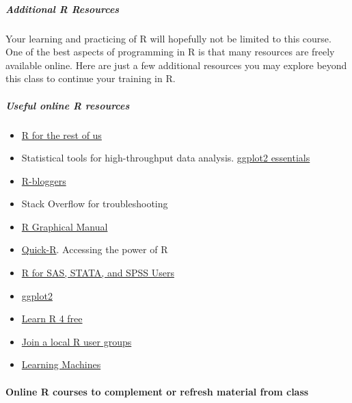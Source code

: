 \documentclass[
  letterpaper,
  DIV=11,
  numbers=noendperiod]{scrartcl}
\let\oldparagraph\paragraph
\renewcommand{\paragraph}[1]{\oldparagraph{#1}\mbox{}}
\let\oldsubparagraph\subparagraph
\renewcommand{\subparagraph}[1]{\oldsubparagraph{#1}\mbox{}}
\providecommand{\tightlist}{%
  \setlength{\itemsep}{0pt}\setlength{\parskip}{0pt}}\usepackage{longtable,booktabs,array}
\begin{document}
\hypertarget{additional-r-resources}{%
\subparagraph{Additional R Resources}\label{additional-r-resources}}

Your learning and practicing of R will hopefully not be limited to this
course. One of the best aspects of programming in R is that many
resources are freely available online. Here are just a few additional
resources you may explore beyond this class to continue your training in
R.

\hypertarget{useful-online-r-resources}{%
\subparagraph{Useful online R
resources}\label{useful-online-r-resources}}

\begin{itemize}
\tightlist
\item
  \href{https://rfortherestofus.com/}{R for the rest of us}
\item
  Statistical tools for high-throughput data analysis.
  \href{http://www.sthda.com/english/wiki/ggplot2-essentials\#google_vignette}{ggplot2
  essentials}
\item
  \href{http://www.r-bloggers.com/}{R-bloggers}
\item
  Stack Overflow for troubleshooting
\item
  \href{https://www.imsbio.co.jp/RGM/R_image_list}{R Graphical Manual}
\item
  \href{http://www.statmethods.net/}{Quick-R}. Accessing the power of R
\item
  \href{http://r4stats.com/}{R for SAS, STATA, and SPSS Users}
\item
  \href{https://ggplot2.tidyverse.org/}{ggplot2}
\item
  \href{https://www.learnr4free.com/en/index.html}{Learn R 4 free}
\item
  \href{https://www.r-consortium.org/blog/2019/09/09/r-community-explorer-r-user-groups}{Join
  a local R user groups}
\item
  \href{https://blog.ephorie.de/learning-r-the-ultimate-introduction-incl-machine-learning}{Learning
  Machines}
\end{itemize}

\hypertarget{online-r-courses-to-complement-or-refresh-material-from-class}{%
\paragraph{Online R courses to complement or refresh material from
class}\label{online-r-courses-to-complement-or-refresh-material-from-class}}
\end{document}
